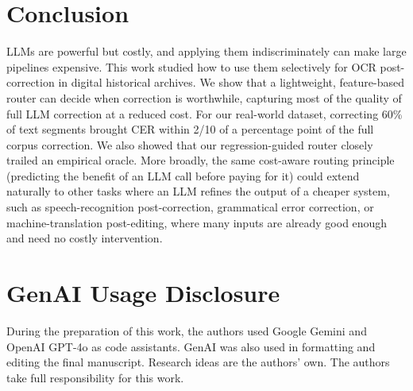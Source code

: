 \documentclass[sigconf]{acmart}
\begin{document}
\vspace{-0.1em}\section{Conclusion}
LLMs are powerful but costly, and applying them
indiscriminately can make large pipelines expensive. This work
studied how to use them selectively for OCR post-correction in digital
historical archives. We show that a lightweight, feature-based router
can decide when correction is worthwhile, capturing most of the quality of full
LLM correction at a reduced cost. For our real-world dataset, correcting 60\% of text segments
brought CER within 2/10 of a percentage point of the full corpus correction. We also showed that our
regression-guided router closely trailed an empirical oracle. More broadly, the
same cost-aware routing principle (predicting the benefit of an LLM call before
paying for it) could extend naturally to other tasks where an LLM refines the output
of a cheaper system, such as speech-recognition post-correction, grammatical
error correction, or machine-translation post-editing, where many inputs are
already good enough and need no costly intervention.

\clearpage

\section*{GenAI Usage Disclosure}
During the preparation of this work, the authors used Google Gemini and OpenAI GPT-4o as code assistants. GenAI was also used in formatting and editing the final manuscript. Research ideas are the authors' own. The authors take full responsibility for this work.



\end{document}
